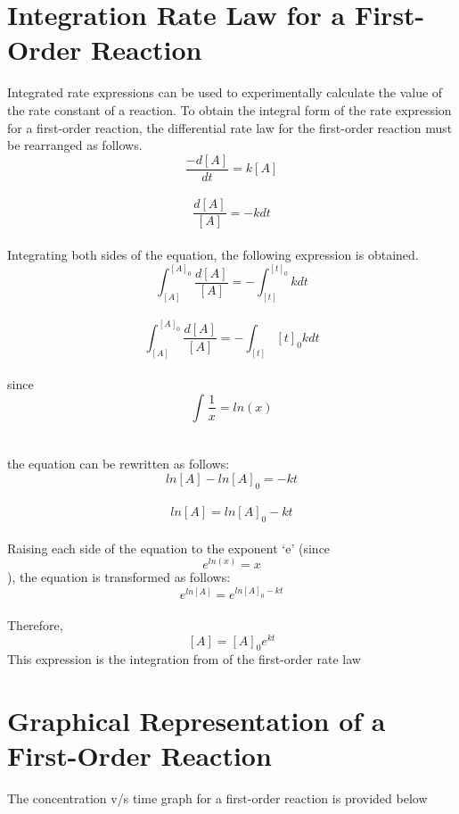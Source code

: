 \section{{\color{blue}Integration Rate Law for a First-Order Reaction}}
Integrated rate expressions can be used to experimentally calculate the value of the rate constant of a reaction. To obtain the integral form of the rate expression for a first-order reaction, the differential rate law for the first-order reaction must be rearranged as follows.
\\
$$\frac{-d[A]}{dt} = k[A]$$
\\
$$\frac{d[A]}{[A]} = -kdt$$
\\
Integrating both sides of the equation, the following expression is obtained.
$$\int_{[A]}^{[A]_0} \frac{d[A]}{[A]} = -\int_{[t]}^{[t]_0}  kdt$$
\\
$$\int_{[A]}^{[A]_0}\frac{d[A]}{[A]} = - \int_{[t]}{[t]_0} kdt $$
\\
since
$$\int_{}^{}\frac{1}{x} = ln(x)$$

\\
the equation can be rewritten as follows:
\\
$$ln[A]-ln[A]_0 = -kt$$
\\
$$ln[A] = ln[A]_0-kt$$
\\
Raising each side of the equation to the exponent ‘e’ (since $$e^{ln(x)} = x$$), the equation is transformed as follows:
$$e^{ln[A]} = e^{ln[A]_0 - kt}$$
\\
Therefore,
$$[A] = [A]_0 e^{kt}$$
This expression is the integration from of the first-order rate law
\\

\section{{\color{blue}Graphical Representation of a First-Order Reaction}}

The concentration v/s time graph for a first-order reaction is provided below


